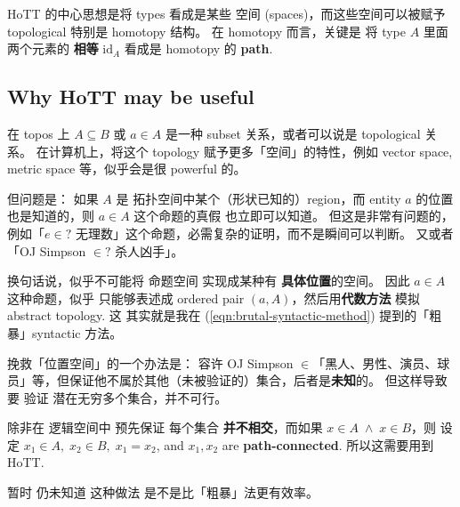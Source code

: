 HoTT 的中心思想是将 types 看成是某些 空间 (spaces)，而这些空间可以被赋予 topological 特别是 homotopy 结构。 在 homotopy 而言，关键是 将 type $A$ 里面两个元素的 \textbf{相等} $\mathrm{id}_A$ 看成是 homotopy 的 \textbf{path}.

\subsection{Why HoTT may be useful}

在 topos 上 $A \subseteq B$ 或 $a \in A$ 是一种 subset 关系，或者可以说是 topological 关系。  在计算机上，将这个 topology 赋予更多「空间」的特性，例如 vector space, metric space 等，似乎会是很 powerful 的。 

但问题是： 如果 $A$ 是 拓扑空间中某个（形状已知的）region，而 entity $a$ 的位置也是知道的，则 $a \in A$ 这个命题的真假 也立即可以知道。 但这是非常有问题的，例如「$e \in?$ 无理数」这个命题，必需复杂的证明，而不是瞬间可以判断。 又或者「OJ Simpson $\in?$ 杀人凶手」。

换句话说，似乎不可能将 命题空间 实现成某种有 \textbf{具体位置}的空间。  因此 $a \in A$ 这种命题，似乎 只能够表述成 ordered pair $(a, A)$，然后用\textbf{代数方法} 模拟 abstract topology.  这 其实就是我在 (\ref{eqn:brutal-syntactic-method}) 提到的「粗暴」syntactic 方法。 

挽救「位置空间」的一个办法是： 容许 OJ Simpson $\in$「黑人、男性、演员、球员」等，但保证他不属於其他（未被验证的）集合，后者是\textbf{未知}的。 但这样导致要 验证 潜在无穷多个集合，并不可行。

除非在 逻辑空间中 预先保证 每个集合 \textbf{并不相交}，而如果 $x \in A \; \wedge \; x \in B$，则 设定 $x_1 \in A, \; x_2 \in B, \; x_1 = x_2$, and $x_1, x_2$ are \textbf{path-connected}.  所以这需要用到 HoTT.

暂时 仍未知道 这种做法 是不是比「粗暴」法更有效率。 

